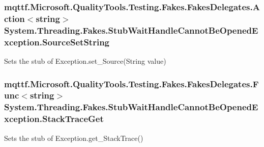 \hypertarget{class_system_1_1_threading_1_1_fakes_1_1_stub_wait_handle_cannot_be_opened_exception_a790fce03fc196fd69b5a4f5b7eb766a5}{
\subsubsection[{Source\-Set\-String}]{\setlength{\rightskip}{0pt plus 5cm}mqttf.\-Microsoft.\-Quality\-Tools.\-Testing.\-Fakes.\-Fakes\-Delegates.\-Action$<$string$>$ System.\-Threading.\-Fakes.\-Stub\-Wait\-Handle\-Cannot\-Be\-Opened\-Exception.\-Source\-Set\-String}}\label{class_system_1_1_threading_1_1_fakes_1_1_stub_wait_handle_cannot_be_opened_exception_a790fce03fc196fd69b5a4f5b7eb766a5}


Sets the stub of Exception.\-set\-\_\-\-Source(\-String value)

\hypertarget{class_system_1_1_threading_1_1_fakes_1_1_stub_wait_handle_cannot_be_opened_exception_ab2d684de27f8e4a8ba86164c35c739f1}{
\subsubsection[{Stack\-Trace\-Get}]{\setlength{\rightskip}{0pt plus 5cm}mqttf.\-Microsoft.\-Quality\-Tools.\-Testing.\-Fakes.\-Fakes\-Delegates.\-Func$<$string$>$ System.\-Threading.\-Fakes.\-Stub\-Wait\-Handle\-Cannot\-Be\-Opened\-Exception.\-Stack\-Trace\-Get}}\label{class_system_1_1_threading_1_1_fakes_1_1_stub_wait_handle_cannot_be_opened_exception_ab2d684de27f8e4a8ba86164c35c739f1}


Sets the stub of Exception.\-get\-\_\-\-Stack\-Trace()

